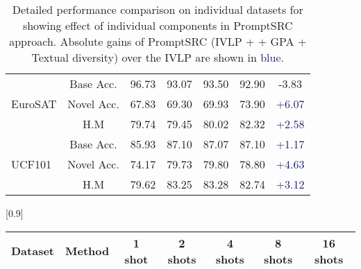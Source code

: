 \documentclass[10pt,twocolumn,letterpaper]{article}
\begin{document}
\begin{center}
\begin{table*}[!t]
{\begin{tabular}{lc|cccc|c}
\midrule
\multirow{3}{*}{EuroSAT}       & Base Acc.       & 96.73 & 93.07    & 93.50  &92.90 &  \textcolor{Bittersweet}{{-3.83}}\\
                               & Novel Acc.      & 67.83 & 69.30    & 69.93& 73.90   & \textcolor{MidnightBlue}{{+6.07}}\\
                               & H.M            & 79.74 & 79.45    & 80.02& 82.32   &  \textcolor{MidnightBlue}{{+2.58}}\\
\midrule
\multirow{3}{*}{UCF101}        & Base Acc.      & 85.93  & 87.10   & 87.07  &87.10   & \textcolor{MidnightBlue}{{+1.17}}\\
                               & Novel Acc.      & 74.17  & 79.73   & 79.80  &78.80  &  \textcolor{MidnightBlue}{{+4.63}}\\
                               & H.M            & 79.62  & 83.25   & 83.28 &82.74  & \textcolor{MidnightBlue}{{+3.12}}\\
\bottomrule
\end{tabular}}
    \caption{\small Detailed performance comparison on individual datasets for showing effect of individual components in PromptSRC approach. Absolute gains of PromptSRC (IVLP +  + GPA + Textual diversity) over the IVLP are shown in \textcolor{MidnightBlue}{blue}. }
    \label{tab_appendix:base_to_new}
\end{table*}

 
\begin{table*}[t!]
    \small \centering
 \setlength{\tabcolsep}{15pt}
    \scalebox{0.9}[0.9]{
\begin{tabular}{ll|ccccc}
\toprule
\textbf{Dataset} & 
 \textbf{Method} & 
\textbf{1 shot} &
\textbf{2 shots} & 
\textbf{4 shots} & 
\textbf{ 8 shots} &
\textbf{16 shots} \\  \midrule


\end{tabular}}
\end{table*}
\end{center}
\end{document}
